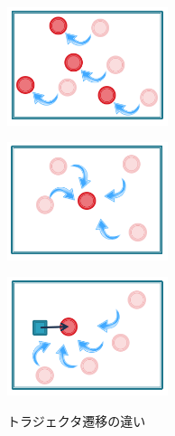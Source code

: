 \begin{figure}[h]
	\centering
	\begin{minipage}[t]{.3\textwidth}
		\centering
		\includegraphics[width=4.7cm]{figure1_sub_a.png} \\ %
		\label{subfigure:2_moving_trajector1}    
	\end{minipage}
	\begin{minipage}[t]{.3\textwidth}
		\centering
		\includegraphics[width=4.7cm]{figure1_sub_b.png} \\ %
		\label{subfigure:2_moving_trajector2}
	\end{minipage}
	\begin{minipage}[t]{.3\textwidth}
		\centering
		\includegraphics[width=4.7cm]{figure1_sub_c.png} \\ %
		\label{subfigure:2_moving_trajector3}
	\end{minipage}
	\caption{トラジェクタ遷移の違い}
	\label{figure:2_moving_trajector}
\end{figure}

